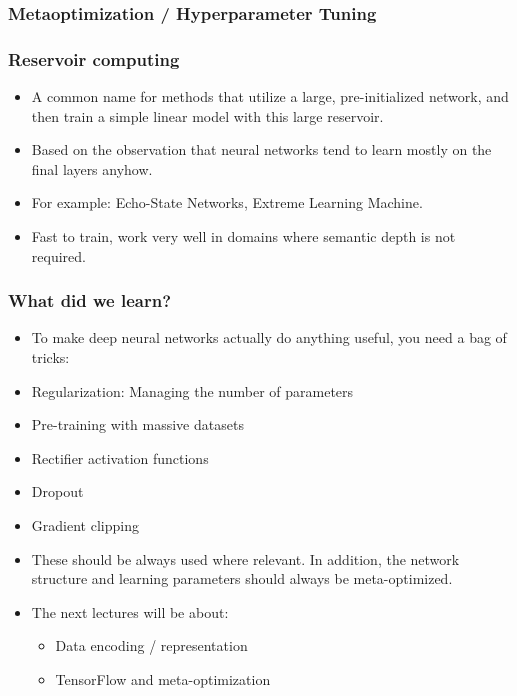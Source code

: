 \documentclass[8pt]{beamer}
\begin{document}
\begin{frame}
\frametitle{Metaoptimization / Hyperparameter Tuning}
\end{frame}

\begin{frame}
\frametitle{Reservoir computing}
 \begin{itemize}
 \item A common name for methods that utilize a large, pre-initialized network, and then train a simple linear model with this large reservoir.
 \item Based on the observation that neural networks tend to learn mostly on the final layers anyhow.
 \item For example: Echo-State Networks, Extreme Learning Machine.
 \item Fast to train, work very well in domains where semantic depth is not required.
\end{itemize}
\end{frame}

\begin{frame}
\frametitle{What did we learn?}
 \begin{itemize}
  \item To make deep neural networks actually do anything useful, you need a bag of tricks:
  \item Regularization: Managing the number of parameters
  \item Pre-training with massive datasets
  \item Rectifier activation functions
  \item Dropout
  \item Gradient clipping
  \item These should be always used where relevant. In addition, the network structure and learning parameters should always be meta-optimized.
  \item The next lectures will be about:
  \begin{itemize}
    \item Data encoding / representation
    \item TensorFlow and meta-optimization
  \end{itemize}
 \end{itemize}
\end{frame}
\end{document}
